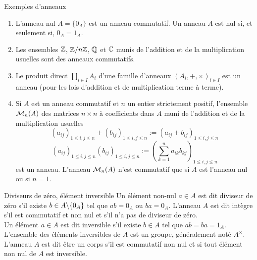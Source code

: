 \documentclass[]{report}
\begin{document}
\begin{ex}{Exemples d'anneaux}{}
    \begin{enumerate}
        \item L'anneau nul $A = \{0_A\}$ est un anneau commutatif. Un anneau $A$ est nul si, et seulement si, $0_A = 1_A$.
        \item Les ensembles $\mathbb{Z}$, $\mathbb{Z}/n\mathbb{Z}$, $\mathbb{Q}$ et $\mathbb{C}$ munis de l'addition et de la multiplication usuelles sont des anneaux commutatifs.
        \item Le produit direct $\prod_{i \in I} A_i$ d'une famille d'anneaux $(A_i, +, \times)_{i \in I}$ est un anneau (pour les lois d'addition et de multiplication terme à terme).
        \item Si $A$ est un anneau commutatif et $n$ un entier strictement positif, l'ensemble $\mathcal{M}_n(A)$ des matrices $n \times n$ à coefficients dans $A$ muni de l'addition et de la multiplication usuelles
        \[(a_{ij})_{1 \le i,j \le n} + (b_{ij})_{1 \le i,j \le n} := (a_{ij} + b_{ij})_{1 \le i,j \le n}\]
        \[(a_{ij})_{1 \le i,j \le n} (b_{ij})_{1 \le i,j \le n} := \left( \sum_{k=1}^n a_{ik} b_{kj} \right)_{1 \le i,j \le n}\]
        est un anneau. L'anneau $\mathcal{M}_n(A)$ n'est commutatif que si $A$ est l'anneau nul ou si $n = 1$.
    \end{enumerate}
\end{ex}

\begin{df}{Diviseurs de zéro, élément inversible}{}
    Un élément non-nul $a\in A$ est dit diviseur de zéro s'il existe $b\in A\backslash \{0_A\}$ tel que $ab=0_A$ ou $ba=0_A$. L'anneau $A$ est dit intègre s'il est commutatif et non nul et s'il n'a pas de diviseur de zéro.\\
    Un élément $a\in A$ est dit inversible s'il existe $b\in A$ tel que $ab=ba=1_A$. L'ensemble des éléments inversibles de $A$ est un groupe, généralement noté $A^\times$. L'anneau $A$ est dit être un corps s'il est commutatif non nul et si tout élément non nul de $A$ est inversible.
\end{df}
\end{document}
